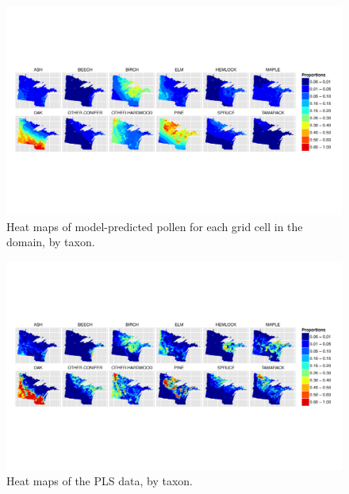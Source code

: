 \begin{figure}
\centering
\includegraphics[width=7in]{figures/maps_pollen.pdf}
\caption{Heat maps of model-predicted pollen for each grid cell in the domain, by taxon.}
\label{fig:maps_pollen}
\end{figure}

\begin{figure}
\centering
\includegraphics[width=7in]{figures/maps_veg.pdf}
\caption{Heat maps of the PLS data, by taxon.}
\label{fig:maps_veg}
\end{figure}





